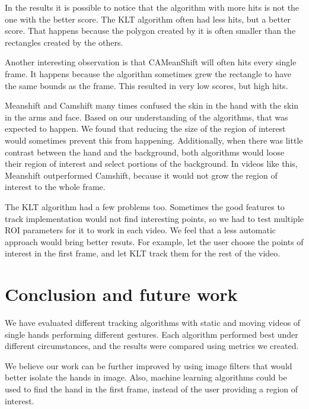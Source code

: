 \documentclass[a4paper]{article}
\begin{document}
In the results it is possible to notice that the algorithm with more hits is not the one with the better score. The KLT algorithm often had less hits, but a better score. That happens because the polygon created by it is often smaller than the rectangles created by the others. 

Another interesting observation is that CAMeanShift will often hits every single frame. It happens because the algorithm sometimes grew the rectangle to have the same bounds as the frame. This resulted in very low scores, but high hits.

Meanshift and Camshift many times confused the skin in the hand with the skin in the arms and face. Based on our understanding of the algorithms, that was expected to happen. We found that reducing the size of the region of interest would sometimes prevent this from happening. Additionally, when there was little contrast between the hand and the background, both algorithms would loose their region of interest and select portions of the background. In videos like this, Meanshift outperformed Camshift, because it would not grow the region of interest to the whole frame.

The KLT algorithm had a few problems too. Sometimes the good features to track implementation would not find interesting points, so we had to test multiple ROI parameters for it to work in each video. We feel that a less automatic approach would bring better resuts. For example, let the user choose the points of interest in the first frame, and let KLT track them for the rest of the video.

\section{Conclusion and future work}

We have evaluated different tracking algorithms with static and moving videos of single hands performing different gestures.
Each algorithm performed best under different circumstances, and the results were compared using metrics we created.

We believe our work can be further improved by using image filters that would better isolate the hands in image. Also, machine learning algorithms could be used to find the hand in the first frame, instead of the user providing a region of interest.


%


\end{document}
